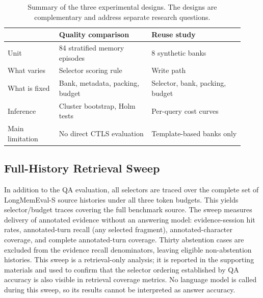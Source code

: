 \begin{table}[htbp]
\centering\small
\caption{Summary of the three experimental designs. The designs are complementary and address separate research questions.}
\label{tab:designs}
\begin{tabular}{p{0.20\linewidth}p{0.36\linewidth}p{0.36\linewidth}}\toprule
& Quality comparison & Reuse study \\\midrule
Unit & 84 stratified memory episodes & 8 synthetic banks \\
What varies & Selector scoring rule & Write path \\
What is fixed & Bank, metadata, packing, budget & Selector, bank, packing, budget \\
Inference & Cluster bootstrap, Holm tests & Per-query cost curves \\
Main limitation & No direct CTLS evaluation & Template-based banks only \\
\bottomrule\end{tabular}\end{table}

\subsection{Full-History Retrieval Sweep}

\label{sec:setup_fullhistory}

In addition to the QA evaluation, all selectors are traced over the complete set of LongMemEval-S source histories under all three token budgets. This yields selector/budget traces covering the full benchmark source. The sweep measures delivery of annotated evidence without an answering model: evidence-session hit rates, annotated-turn recall (any selected fragment), annotated-character coverage, and complete annotated-turn coverage. Thirty abstention cases are excluded from the evidence recall denominators, leaving eligible non-abstention histories. This sweep is a retrieval-only analysis; it is reported in the supporting materials and used to confirm that the selector ordering established by QA accuracy is also visible in retrieval coverage metrics. No language model is called during this sweep, so its results cannot be interpreted as answer accuracy.

\FloatBarrier
